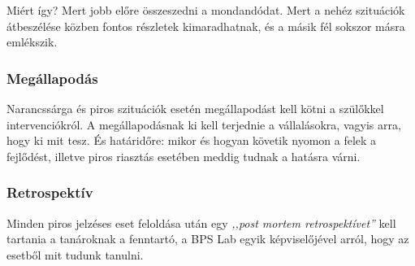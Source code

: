Miért így? Mert jobb előre összeszedni a mondandódat. Mert a nehéz
szituációk átbeszélése közben fontos részletek kimaradhatnak, és a másik
fél sokszor másra emlékszik.

\hypertarget{megallapodas}{%
\subsubsection{Megállapodás}\label{megallapodas}}

Narancssárga és piros szituációk esetén megállapodást kell kötni a
szülőkkel intervenciókról. A megállapodásnak ki kell terjednie a
vállalásokra, vagyis arra, hogy ki mit tesz. És határidőre: mikor és hogyan
követik nyomon a felek a fejlődést, illetve piros riasztás esetében meddig tudnak a
hatásra várni.

\hypertarget{retrospektiv}{%
\subsubsection{Retrospektív}\label{retrospektiv}}

Minden piros jelzéses eset feloldása után egy
\emph{,,post
mortem retrospektívet''} kell tartania a tanároknak a fenntartó, a BPS Lab
egyik képviselőjével arról, hogy az esetből mit tudunk tanulni.
